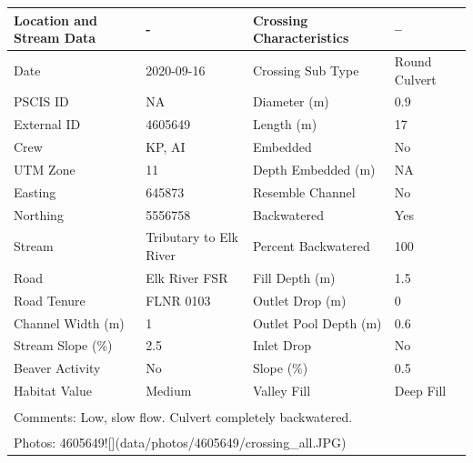 \documentclass[
]{book}
\begin{document}
\begin{tabular}{llll}
\toprule
Location and Stream Data & - & Crossing Characteristics & --\\
\midrule
Date & 2020-09-16 & Crossing Sub Type & Round Culvert\\
PSCIS ID & NA & Diameter (m) & 0.9\\
External ID & 4605649 & Length (m) & 17\\
Crew & KP, AI & Embedded & No\\
UTM Zone & 11 & Depth Embedded (m) & NA\\
\addlinespace
Easting & 645873 & Resemble Channel & No\\
Northing & 5556758 & Backwatered & Yes\\
Stream & Tributary to Elk River & Percent Backwatered & 100\\
Road & Elk River FSR & Fill Depth (m) & 1.5\\
Road Tenure & FLNR 0103 & Outlet Drop (m) & 0\\
\addlinespace
Channel Width (m) & 1 & Outlet Pool Depth (m) & 0.6\\
Stream Slope (\%) & 2.5 & Inlet Drop & No\\
Beaver Activity & No & Slope (\%) & 0.5\\
Habitat Value & Medium & Valley Fill & Deep Fill\\
\bottomrule
\multicolumn{4}{l}{\textsuperscript{} Comments: Low, slow flow. Culvert completely backwatered.}\\
\multicolumn{4}{l}{\textsuperscript{} Photos: 4605649![](data/photos/4605649/crossing\_all.JPG)}\\
\end{tabular}
\end{document}
